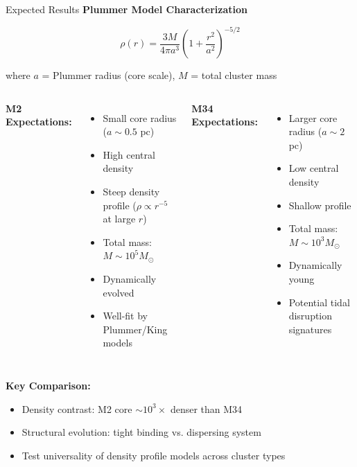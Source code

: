 \documentclass{beamer}
\begin{document}

\begin{frame}{Expected Results}
    \textbf{Plummer Model Characterization}

    $$\rho(r) = \frac{3M}{4\pi a^3}\left(1 + \frac{r^2}{a^2}\right)^{-5/2}$$

    where $a$ = Plummer radius (core scale), $M$ = total cluster mass

    \vspace{0.5cm}

    \begin{columns}[c]
        \textbf{M2 Expectations:}
        \begin{itemize}
            \item Small core radius ($a \sim 0.5$ pc)
            \item High central density
            \item Steep density profile ($\rho \propto r^{-5}$ at large $r$)
            \item Total mass: $M \sim 10^5 M_\odot$
            \item Dynamically evolved
            \item Well-fit by Plummer/King models
        \end{itemize}

        \textbf{M34 Expectations:}
        \begin{itemize}
            \item Larger core radius ($a \sim 2$ pc)
            \item Low central density
            \item Shallow profile
            \item Total mass: $M \sim 10^3 M_\odot$
            \item Dynamically young
            \item Potential tidal disruption signatures
        \end{itemize}
    \end{columns}

    \vspace{0.5cm}

    \textbf{Key Comparison:}
    \begin{itemize}
        \item Density contrast: M2 core $\sim 10^3 \times$ denser than M34
        \item Structural evolution: tight binding vs. dispersing system
        \item Test universality of density profile models across cluster types
    \end{itemize}
\end{frame}
\end{document}
